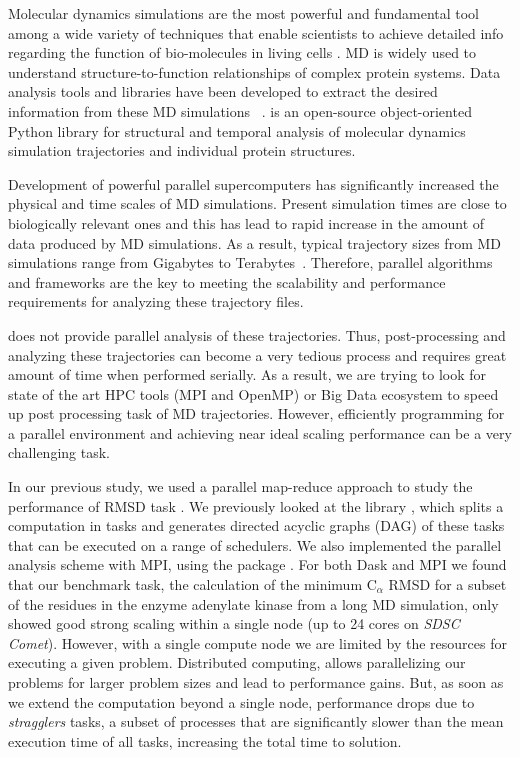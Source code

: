 \label{sec:introduction}
Molecular dynamics simulations are the most powerful and fundamental tool among a wide variety of techniques that enable scientists to achieve detailed info regarding the function of bio-molecules in living cells \cite{QwikMD2016}.
MD is widely used to understand structure-to-function relationships of complex protein systems.
Data analysis tools and libraries have been developed to extract the desired information from these MD simulations ~\cite{Gowers:2016aa,Michaud-Agrawal:2011fu,cpptraj-2013,himach-2008,mdtraj-2015,Mura:2010mw}.
 \citep{Gowers:2016aa,Michaud-Agrawal:2011fu} is an open-source object-oriented Python library for structural and temporal analysis of molecular dynamics simulation trajectories and individual protein structures. 

Development of powerful parallel supercomputers has significantly increased the physical and time scales of MD simulations.
Present simulation times are close to biologically relevant ones and this has lead to rapid increase in the amount of data produced by MD simulations. 
As a result, typical trajectory sizes from MD simulations range from Gigabytes to Terabytes~\cite{Cheatham:2015}. 
Therefore, parallel algorithms and frameworks are the key to meeting the scalability and performance requirements for analyzing these trajectory files. 

 does not provide parallel analysis of these trajectories.
Thus, post-processing and analyzing these trajectories can become a very tedious process and requires great amount of time when performed serially. 
As a result, we are trying to look for state of the art HPC tools (MPI and OpenMP) or Big Data ecosystem to speed up post processing task of MD trajectories.
However, efficiently programming for a parallel environment and achieving near ideal scaling performance can be a very challenging task. 

In our previous study, we used a parallel map-reduce approach to study the performance of RMSD task \cite{Khoshlessan:2017ab, ICCP-2018}. 
We previously looked at the  library \cite{Rocklin:2015aa}, which splits a computation in tasks and generates directed acyclic graphs (DAG) of these tasks that can be executed on a range of schedulers. 
We also implemented the parallel analysis scheme with MPI, using the  package \cite{Dalcin:2011aa, Dalcin:2005aa}. 
For both Dask and MPI we found that our benchmark task, the calculation of the minimum C$_{\alpha}$ RMSD for a
subset of the residues in the enzyme adenylate kinase from a long MD simulation, only showed good strong scaling within a single node (up to 24 cores on \emph{SDSC Comet}).
However, with a single compute node we are limited by the resources for executing a given problem.
Distributed computing, allows parallelizing our problems for larger problem sizes and lead to performance gains.
But, as soon as we extend the computation beyond a single node, performance drops due to \emph{stragglers} tasks, a subset of processes that are significantly slower than the mean execution time of all tasks, increasing the total time to solution.

